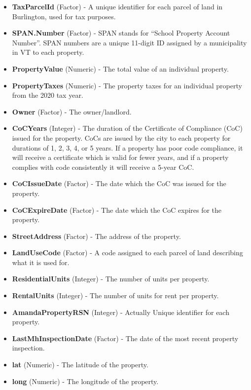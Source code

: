 \documentclass[
]{article}
\providecommand{\tightlist}{%
  \setlength{\itemsep}{0pt}\setlength{\parskip}{0pt}}
\begin{document}
\begin{itemize}
\tightlist
\item
  \textbf{TaxParcelId} (Factor) - A unique identifier for each parcel of
  land in Burlington, used for tax purposes.
\item
  \textbf{SPAN.Number} (Factor) - SPAN stands for ``School Property
  Account Number''. SPAN numbers are a unique 11-digit ID assigned by a
  municipality in VT to each property.
\item
  \textbf{PropertyValue} (Numeric) - The total value of an individual
  property.
\item
  \textbf{PropertyTaxes} (Numeric) - The property taxes for an
  individual property from the 2020 tax year.
\item
  \textbf{Owner} (Factor) - The owner/landlord.
\item
  \textbf{CoCYears} (Integer) - The duration of the Certificate of
  Compliance (CoC) issued for the property. CoCs are issued by the city
  to each property for durations of 1, 2, 3, 4, or 5 years. If a
  property has poor code compliance, it will receive a certificate which
  is valid for fewer years, and if a property complies with code
  consistently it will receive a 5-year CoC.
\item
  \textbf{CoCIssueDate} (Factor) - The date which the CoC was issued for
  the property.
\item
  \textbf{CoCExpireDate} (Factor) - The date which the CoC expires for
  the property.
\item
  \textbf{StreetAddress} (Factor) - The address of the property.
\item
  \textbf{LandUseCode} (Factor) - A code assigned to each parcel of land
  describing what it is used for.
\item
  \textbf{ResidentialUnits} (Integer) - The number of units per
  property.
\item
  \textbf{RentalUnits} (Integer) - The number of units for rent per
  property.
\item
  \textbf{AmandaPropertyRSN} (Integer) - Actually Unique identifier for
  each property.
\item
  \textbf{LastMhInspectionDate} (Factor) - The date of the most recent
  property inspection.
\item
  \textbf{lat} (Numeric) - The latitude of the property.
\item
  \textbf{long} (Numeric) - The longitude of the property.
\end{itemize}
\end{document}
